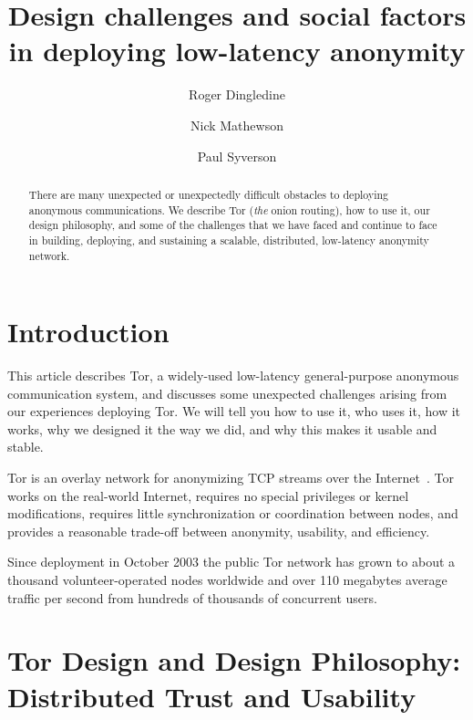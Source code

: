 \documentclass{llncs}
\begin{document}
\title{Design challenges and social factors in deploying low-latency anonymity}

\author{Roger Dingledine \and
Nick Mathewson \and
Paul Syverson}

\maketitle
\pagestyle{plain}

\begin{abstract}
  There are many unexpected or unexpectedly difficult obstacles to
  deploying anonymous communications.  We describe Tor (\emph{the}
  onion routing), how to use it, our design philosophy, and some of
  the challenges that we have faced and continue to face in building,
  deploying, and sustaining a scalable, distributed, low-latency
  anonymity network.
\end{abstract}

\section{Introduction}
This article describes Tor, a widely-used low-latency general-purpose
anonymous communication system, and discusses some unexpected
challenges arising from our experiences deploying Tor.  We will tell
you how to use it, who uses it, how it works, why we designed it the
way we did, and why this makes it usable and stable.

Tor is an overlay network for anonymizing TCP streams over the
Internet~\cite{tor-design}.  Tor works on the real-world Internet,
requires no special privileges or kernel modifications, requires
little synchronization or coordination between nodes, and provides a
reasonable trade-off between anonymity, usability, and efficiency.

Since deployment in October 2003 the public Tor network has grown to
about a thousand volunteer-operated nodes worldwide and over 110
megabytes average traffic per second from hundreds of thousands of
concurrent users. 

\section{Tor Design and Design Philosophy: Distributed Trust and Usability}
\end{document}
